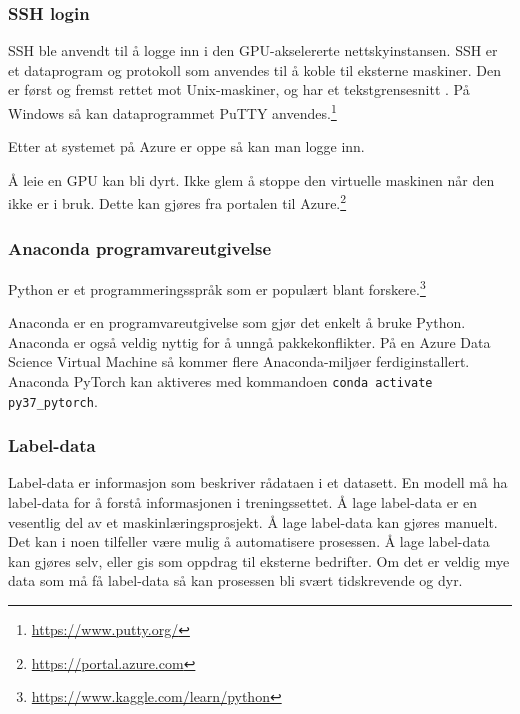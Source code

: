 
\subsubsection{SSH login}

SSH ble anvendt til å logge inn i den GPU-akselererte nettskyinstansen. SSH er et dataprogram og protokoll som anvendes til å koble til eksterne maskiner. Den er først og fremst rettet mot Unix-maskiner, og har et tekstgrensesnitt \cite{Mallick m.fl. 2020}. På Windows så kan dataprogrammet PuTTY anvendes.\footnote{\url{https://www.putty.org/}}

Etter at systemet på Azure er oppe så kan man logge inn.%

Å leie en GPU kan bli dyrt. Ikke glem å stoppe den virtuelle maskinen når den ikke er i bruk. Dette kan gjøres fra portalen til Azure.\footnote{\url{https://portal.azure.com}}


\subsubsection{Anaconda programvareutgivelse}

Python er et programmeringsspråk som er populært blant forskere.\footnote{\url{https://www.kaggle.com/learn/python}} \cite{Morris 2020}

Anaconda er en programvareutgivelse som gjør det enkelt å bruke Python. Anaconda er også veldig nyttig for å unngå pakkekonflikter. På en Azure Data Science Virtual Machine så kommer flere Anaconda-miljøer ferdiginstallert. Anaconda PyTorch kan aktiveres med kommandoen \texttt{conda activate py37\_pytorch}. \cite{Mallick m.fl. 2020} %

\subsubsection{Label-data}

Label-data er informasjon som beskriver rådataen i et datasett. En modell må ha label-data for å forstå informasjonen i treningssettet. Å lage label-data er en vesentlig del av et maskinlæringsprosjekt. Å lage label-data kan gjøres manuelt. Det kan i noen tilfeller være mulig å automatisere prosessen. Å lage label-data kan gjøres selv, eller gis som oppdrag til eksterne bedrifter. Om det er veldig mye data som må få label-data så kan prosessen bli svært tidskrevende og dyr. \cite{Kaller 2019}


